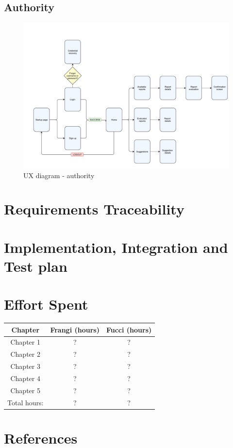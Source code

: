 \documentclass[12pt,a4paper]{report}
\begin{document}
	\section{Authority}		
		\begin{figure}[H]
				\includegraphics[scale = 0.6, center]{authorityux}
				\caption{UX diagram - authority}
		\end{figure}

	\chapter{Requirements Traceability}

	\chapter{Implementation, Integration and Test plan}

	\chapter{Effort Spent}
		\begin{table}[H]
		\centering
		\begin{tabular}{|c|c|c|}
			\hline
			Chapter & Frangi (hours) & Fucci (hours)\\
			\hline
			\hline
			Chapter 1 & ? & ?\\
			\hline
			Chapter 2 & ? & ?\\
			\hline
			Chapter 3 & ? & ?\\
			\hline
			Chapter 4 & ? & ?\\
			\hline
			Chapter 5 & ? & ?\\
			\hline
			Total hours: & ? & ?\\
			\hline
		\end{tabular}
		\label{tab: }
	\end{table}
	\chapter{References}
\end{document}
